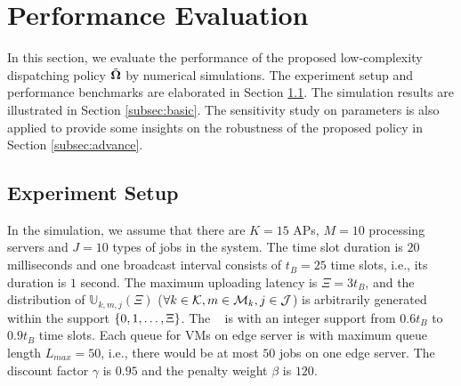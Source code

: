 \section{Performance Evaluation}
\label{sec:evaluation}
In this section, we evaluate the performance of the proposed low-complexity dispatching policy $\tilde{\boldsymbol{\Omega}}$ by numerical simulations.
The experiment setup and performance benchmarks are elaborated in Section \ref{subsec:setup}.
The simulation results are illustrated in Section \ref{subsec:basic}.
The sensitivity study on parameters is also applied to provide some insights on the robustness of the proposed policy in Section \ref{subsec:advance}.

\subsection{Experiment Setup}
\label{subsec:setup}
In the simulation, we assume that there are $K=15$ APs, $M=10$ processing servers and $J=10$ types of jobs in the system.
The time slot duration is $20$ milliseconds and one broadcast interval consists of $t_{B}=25$ time slots, i.e., its duration is $1$ second.
The maximum uploading latency is $\Xi = 3t_B$, and the distribution of $\mathbb{U}_{k,m,j}(\Xi)$ ($\forall k\in\mathcal{K}, m\in\mathcal{M}_{k}, j\in\mathcal{J}$) is arbitrarily generated within the support $\{0, 1, \dots, \Xi\}$.
The \brlatency~ is with an integer support from $0.6t_B$ to $0.9t_B$ time slots.
Each queue for VMs on edge server is with maximum queue length $L_{max}=50$, i.e., there would be at most $50$ jobs on one edge server.
The discount factor $\gamma$ is $0.95$ and the penalty weight $\beta$ is $120$.

